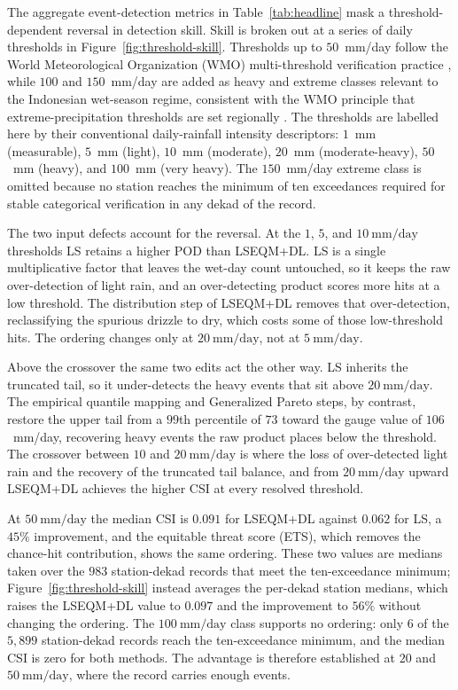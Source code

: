 The aggregate event-detection metrics in
Table~\ref{tab:headline} mask a threshold-dependent reversal in
detection skill. Skill is broken out at a series of daily
thresholds in Figure~\ref{fig:threshold-skill}. Thresholds up to
$50$~mm/day follow the World Meteorological Organization (WMO)
multi-threshold verification practice \citep{ref:wmo1485,
ref:wmo1132}, while $100$ and $150$~mm/day are added as heavy and
extreme classes relevant to the Indonesian wet-season regime,
consistent with the WMO principle that extreme-precipitation
thresholds are set regionally \citep{ref:wmo1310}. The thresholds
are labelled here by their conventional daily-rainfall intensity
descriptors: $1$~mm (measurable), $5$~mm (light), $10$~mm
(moderate), $20$~mm (moderate-heavy), $50$~mm (heavy), and
$100$~mm (very heavy). The $150$~mm/day extreme class is omitted
because no station reaches the minimum of ten exceedances required
for stable categorical verification in any dekad of the record.

The two input defects account for the reversal. At the
$1$, $5$, and $10~\mathrm{mm/day}$ thresholds LS retains a higher
POD than LSEQM+DL. LS is a single multiplicative factor that leaves
the wet-day count untouched, so it keeps the raw over-detection of
light rain, and an over-detecting product scores more hits at a low
threshold. The distribution step of LSEQM+DL removes that
over-detection, reclassifying the spurious drizzle to dry, which
costs some of those low-threshold hits. The ordering changes only at
$20~\mathrm{mm/day}$, not at $5~\mathrm{mm/day}$.

Above the crossover the same two edits act the other way. LS
inherits the truncated tail, so it under-detects the heavy events
that sit above $20~\mathrm{mm/day}$. The empirical quantile
mapping and Generalized Pareto steps, by contrast, restore the upper tail from a
$99$th percentile of $73$ toward the gauge value of $106$~mm/day,
recovering heavy events the raw product places below the threshold.
The crossover between $10$ and $20~\mathrm{mm/day}$ is where the
loss of over-detected light rain and the recovery of the truncated
tail balance, and from $20~\mathrm{mm/day}$ upward LSEQM+DL
achieves the higher CSI at every resolved threshold.

At $50~\mathrm{mm/day}$ the median CSI is $0.091$ for LSEQM+DL
against $0.062$ for LS, a $45\%$ improvement, and the equitable
threat score (ETS), which removes the chance-hit contribution,
shows the same ordering. These two values are medians taken over
the $983$ station-dekad records that meet the ten-exceedance
minimum; Figure~\ref{fig:threshold-skill} instead averages the
per-dekad station medians, which raises the LSEQM+DL value to
$0.097$ and the improvement to $56\%$ without changing the
ordering. The $100~\mathrm{mm/day}$ class supports
no ordering: only $6$ of the $5{,}899$ station-dekad records reach
the ten-exceedance minimum, and the median CSI is zero for both
methods. The advantage is therefore established at $20$ and
$50~\mathrm{mm/day}$, where the record carries enough events.

